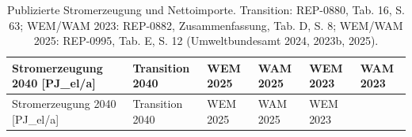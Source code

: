 \documentclass[
  ngerman,
  a4paper,
  DIV=11]{scrreprt}
\begin{document}
\begin{longtable}[]{@{}
  >{\raggedright\arraybackslash}p{}
  >{\raggedleft\arraybackslash}p{}
  >{\raggedleft\arraybackslash}p{}
  >{\raggedleft\arraybackslash}p{}
  >{\raggedleft\arraybackslash}p{}
  >{\raggedleft\arraybackslash}p{}@{}}
\caption{Publizierte Stromerzeugung und Nettoimporte. Transition:
REP-0880, Tab. 16, S. 63; WEM/WAM 2023: REP-0882, Zusammenfassung, Tab.
D, S. 8; WEM/WAM 2025: REP-0995, Tab. E, S. 12 (Umweltbundesamt 2024,
2023b, 2025).}\label{tbl-allokation-stromerzeugung-2040}\tabularnewline
\toprule\noalign{}
\begin{minipage}[b]{\linewidth}\raggedright
Stromerzeugung 2040 {[}PJ\_el/a{]}
\end{minipage} & \begin{minipage}[b]{\linewidth}\raggedleft
Transition 2040
\end{minipage} & \begin{minipage}[b]{\linewidth}\raggedleft
WEM 2025
\end{minipage} & \begin{minipage}[b]{\linewidth}\raggedleft
WAM 2025
\end{minipage} & \begin{minipage}[b]{\linewidth}\raggedleft
WEM 2023
\end{minipage} & \begin{minipage}[b]{\linewidth}\raggedleft
WAM 2023
\end{minipage} \\
\midrule\noalign{}
\endfirsthead
\toprule\noalign{}
\begin{minipage}[b]{\linewidth}\raggedright
Stromerzeugung 2040 {[}PJ\_el/a{]}
\end{minipage} & \begin{minipage}[b]{\linewidth}\raggedleft
Transition 2040
\end{minipage} & \begin{minipage}[b]{\linewidth}\raggedleft
WEM 2025
\end{minipage} & \begin{minipage}[b]{\linewidth}\raggedleft
WAM 2025
\end{minipage} & \begin{minipage}[b]{\linewidth}\raggedleft
WEM 2023
\end{minipage} & \begin{minipage}[b]{\linewidth}\raggedleft

\end{minipage}
\end{longtable}
\end{document}
